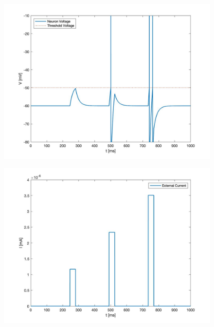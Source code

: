 \documentclass{article}
\begin{document}
\begin{figure}[!htb]
\centering
\begin{minipage}{0.5\textwidth}
  \centering
  \includegraphics[width=0.975\linewidth]{final_paper/lifV.jpg}
  \label{fig:lifV}
\end{minipage}%
\begin{minipage}{0.5\textwidth}
  \centering
  \includegraphics[width=0.975\linewidth]{final_paper/lifI.jpg}
  \label{fig:lifI}
\end{minipage}
\end{figure}
\end{document}
